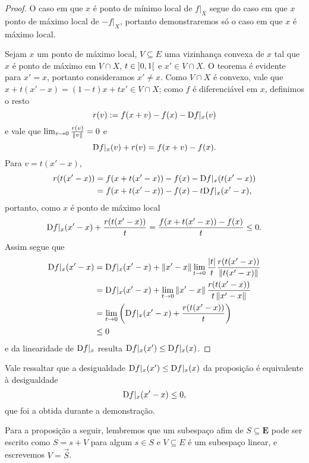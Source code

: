 \begin{proof}
O caso em que $x$ é ponto de mínimo local de $f|_X$ segue do caso em que $x$ ponto de máximo local de $-f|_X$, portanto demonstraremos  só o caso em que $x$ é máximo local.

Sejam $x$ um ponto de máximo local, $V \subseteq E$ uma vizinhança convexa de $x$ tal que $x$ é ponto de máximo em $V \cap X$, $t \in \left]{0},{1}\right[$ e $x' \in V \cap X$. O teorema é evidente para $x'=x$, portanto consideramos $x' \neq x$. Como $V \cap X$ é convexo, vale que $x + t(x'-x) = (1-t)x + tx' \in V \cap X$; como $f$ é diferenciável em $x$, definimos o resto
	\begin{equation*}
	r(v) := f(x + v) - f(x) - \mathrm{D} f|_x(v)
	\end{equation*}
e vale que $\lim_{v \to 0} \frac{r(v)}{\left\Vert{v}\right\Vert} = 0$ e
	\begin{equation*}
	\mathrm{D} f|_x(v) + r(v) = f(x+v) - f(x).
	\end{equation*}
Para $v=t(x'-x)$,
	\begin{align*}
	r(t(x'-x)) &= f(x + t(x'-x)) - f(x) - \mathrm{D} f|_x(t(x'-x)) \\
		&= f(x + t(x'-x)) - f(x) - t\mathrm{D} f|_x(x'-x),
	\end{align*}
portanto, como $x$ é ponto de máximo local
	\begin{equation*}
	\mathrm{D} f|_x(x'-x) + \frac{r(t(x'-x))}{t} = \frac{f(x + t(x'-x)) - f(x)}{t} \leq 0.
	\end{equation*}
Assim segue que
	\begin{align*}
	\mathrm{D} f|_x(x'-x) &= \mathrm{D} f|_x(x'-x) + \left\Vert{x'-x}\right\Vert\lim_{t \to 0} \frac{\left\vert{t}\right\vert}{t}\frac{r(t(x'-x))}{\left\Vert{t(x'-x)}\right\Vert} \\
		&= \mathrm{D} f|_x(x'-x) + \lim_{t \to 0} \left\Vert{x'-x}\right\Vert\frac{r(t(x'-x))}{t\left\Vert{x'-x}\right\Vert} \\
		&= \lim_{t \to 0} \left( \mathrm{D} f|_x(x'-x) + \frac{r(t(x'-x))}{t} \right) \\
		&\leq 0
	\end{align*}
e da linearidade de $\mathrm{D} f|_x$ resulta $\mathrm{D} f|_x(x') \leq \mathrm{D} f|_x(x)$.
\end{proof}

Vale ressaltar que a desigualdade $\mathrm{D} f|_x(x') \leq \mathrm{D} f|_x(x)$ da proposição é equivalente à desigualdade
	\begin{equation*}
	\mathrm{D} f|_x(x'-x) \leq 0,
	\end{equation*}
que foi a obtida durante a demonstração.

Para a proposição a seguir, lembremos que um subespaço afim de $S \subseteq \bm E$ pode ser escrito como $S = s+V$ para algum $s \in S$ e $V \subseteq E$ é um subespaço linear, e escrevemos $V = \vec{S}$.

